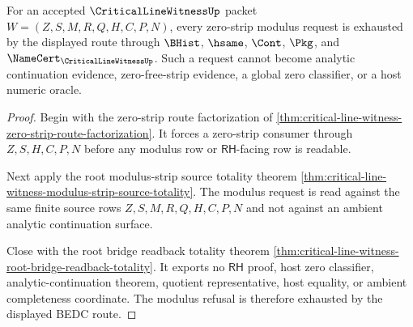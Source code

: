\begin{theorem}
\label{thm:critical-line-witness-modulus-refusal-exhaustion}
For an accepted $\CriticalLineWitnessUp$ packet $W=(Z,S,M,R,Q,H,C,P,N)$, every
zero-strip modulus request is exhausted by the displayed route through
$\BHist$, $\hsame$, $\Cont$, $\Pkg$, and
$\NameCert_{\CriticalLineWitnessUp}$. Such a request cannot become analytic
continuation evidence, zero-free-strip evidence, a global zero classifier, or
a host numeric oracle.
\end{theorem}
\begin{proof}
Begin with the zero-strip route factorization of
\autoref{thm:critical-line-witness-zero-strip-route-factorization}. It forces
a zero-strip consumer through $Z,S,H,C,P,N$ before any modulus row or
$\mathsf{RH}$-facing row is readable.

Next apply the root modulus-strip source totality theorem
\autoref{thm:critical-line-witness-modulus-strip-source-totality}. The
modulus request is read against the same finite source rows
$Z,S,M,R,Q,H,C,P,N$ and not against an ambient analytic continuation surface.

Close with the root bridge readback totality theorem
\autoref{thm:critical-line-witness-root-bridge-readback-totality}. It exports
no $\mathsf{RH}$ proof, host zero classifier, analytic-continuation theorem,
quotient representative, host equality, or ambient completeness coordinate.
The modulus refusal is therefore exhausted by the displayed BEDC route.
\end{proof}

